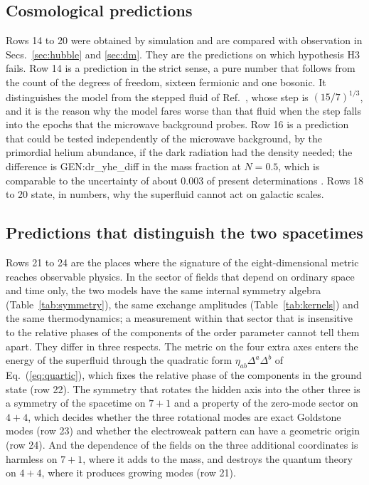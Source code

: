 \subsection{Cosmological predictions}

Rows 14 to 20 were obtained by simulation and are compared with observation in
Secs.~\ref{sec:hubble} and \ref{sec:dm}. They are the predictions on which hypothesis H3 fails. Row
14 is a prediction in the strict sense, a pure number that follows from the count of the degrees of
freedom, sixteen fermionic and one bosonic. It distinguishes the model from the stepped fluid of
Ref.~\cite{Aloni2022}, whose step is $(15/7)^{1/3}$, and it is the reason why the model fares worse
than that fluid when the step falls into the epochs that the microwave background probes. Row 16 is
a prediction that could be tested independently of the microwave background, by the primordial
helium abundance, if the dark radiation had the density needed; the difference is
{{GEN:dr_yhe_diff}} in the mass fraction at $N=0.5$, which is comparable to the uncertainty of about
0.003 of present determinations \cite{PDG2024}. Rows 18 to 20 state, in
numbers, why the superfluid cannot act on galactic scales.

\subsection{Predictions that distinguish the two spacetimes}

Rows 21 to 24 are the places where the signature of the eight-dimensional metric reaches observable
physics. In the sector of fields that depend on ordinary space and time only, the two models have
the same internal symmetry algebra (Table~\ref{tab:symmetry}), the same exchange amplitudes
(Table~\ref{tab:kernels}) and the same thermodynamics; a measurement within that sector that is
insensitive to the relative phases of the components of the order parameter cannot tell them
apart. They differ in three respects. The metric on the four extra axes enters the energy of the
superfluid through the quadratic form $\eta_{ab}\Delta^a\Delta^b$ of Eq.~(\ref{eq:quartic}), which
fixes the relative phase of the components in the ground state (row 22). The symmetry that rotates
the hidden axis into the other three is a symmetry of the spacetime on $7+1$ and a property of the
zero-mode sector on $4+4$, which decides whether the three rotational modes are exact Goldstone
modes (row 23) and whether the electroweak pattern can have a geometric origin (row 24). And the
dependence of the fields on the three additional coordinates is harmless on $7+1$, where it adds to
the mass, and destroys the quantum theory on $4+4$, where it produces growing modes (row 21).
